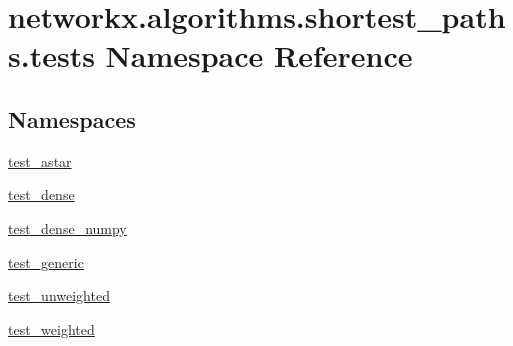 \hypertarget{namespacenetworkx_1_1algorithms_1_1shortest__paths_1_1tests}{}\section{networkx.\+algorithms.\+shortest\+\_\+paths.\+tests Namespace Reference}
\label{namespacenetworkx_1_1algorithms_1_1shortest__paths_1_1tests}
\subsection*{Namespaces}
\begin{DoxyCompactItemize}
\item 
 \hyperlink{namespacenetworkx_1_1algorithms_1_1shortest__paths_1_1tests_1_1test__astar}{test\+\_\+astar}
\item 
 \hyperlink{namespacenetworkx_1_1algorithms_1_1shortest__paths_1_1tests_1_1test__dense}{test\+\_\+dense}
\item 
 \hyperlink{namespacenetworkx_1_1algorithms_1_1shortest__paths_1_1tests_1_1test__dense__numpy}{test\+\_\+dense\+\_\+numpy}
\item 
 \hyperlink{namespacenetworkx_1_1algorithms_1_1shortest__paths_1_1tests_1_1test__generic}{test\+\_\+generic}
\item 
 \hyperlink{namespacenetworkx_1_1algorithms_1_1shortest__paths_1_1tests_1_1test__unweighted}{test\+\_\+unweighted}
\item 
 \hyperlink{namespacenetworkx_1_1algorithms_1_1shortest__paths_1_1tests_1_1test__weighted}{test\+\_\+weighted}
\end{DoxyCompactItemize}

